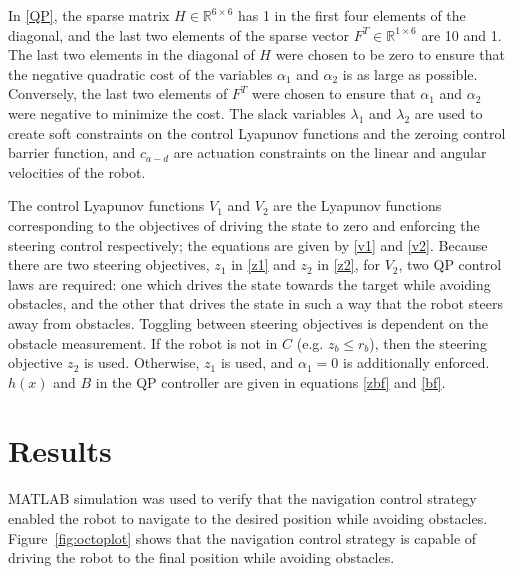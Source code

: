 \documentclass[conference]{IEEEtran}
\begin{document}
In \eqref{QP}, the sparse matrix $H\in \mathbb{R}^{6\times 6}$ has 1 in the first four elements of the diagonal, and the last two elements of the sparse vector $F^T\in \mathbb{R}^{1\times 6}$ are 10 and 1. The last two elements in the diagonal of $H$ were chosen to be zero to ensure that the negative quadratic cost of the variables $\alpha_1$ and $\alpha_2$ is as large as possible. Conversely, the last two elements of $F^T$ were chosen to ensure that $\alpha_1$ and $\alpha_2$ were negative to minimize the cost. The slack variables $\lambda_1$ and $\lambda_2$ are used to create soft constraints on the control Lyapunov functions and the zeroing control barrier function, and $c_{a-d}$ are actuation constraints on the linear and angular velocities of the robot.

The control Lyapunov functions $V_1$ and $V_2$ are the Lyapunov functions corresponding to the objectives of driving the state to zero and enforcing the steering control respectively; the equations are given by \eqref{v1} and \eqref{v2}. Because there are two steering objectives, $z_1$ in \eqref{z1} and $z_2$ in \eqref{z2}, for $V_2$, two QP control laws are required: one which drives the state towards the target while avoiding obstacles, and the other that drives the state in such a way that the robot steers away from obstacles. Toggling between steering objectives is dependent on the obstacle measurement. If the robot is not in $C$ (e.g. $z_b\leq r_b$), then the steering objective $z_2$ is used. Otherwise, $z_1$ is used, and $\alpha_1=0$ is additionally enforced. $h(x)$ and $B$ in the QP controller are given in equations \eqref{zbf} and \eqref{bf}. 

\section{Results}
MATLAB simulation was used to verify that the navigation control strategy enabled the robot to navigate to the desired position while avoiding obstacles. Figure~\ref{fig:octoplot} shows that the navigation control strategy is capable of driving the robot to the final position while avoiding obstacles.
\end{document}
